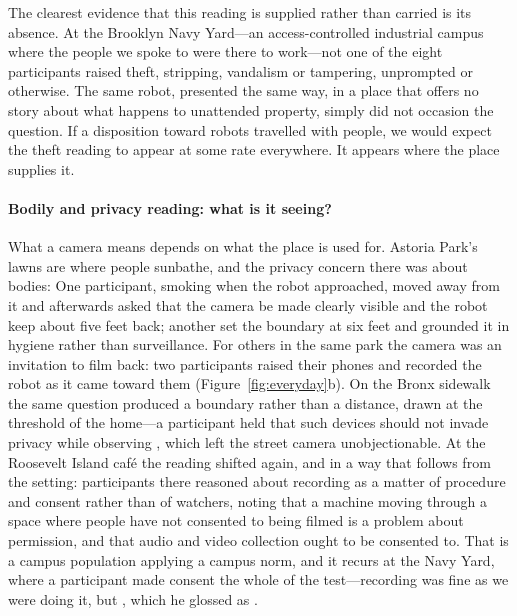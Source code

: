 The clearest evidence that this reading is supplied rather than carried is its
absence. At the Brooklyn Navy Yard---an access-controlled industrial campus where
the people we spoke to were there to work---not one of the eight participants
raised theft, stripping, vandalism or tampering, unprompted or otherwise. The
same robot, presented the same way, in a place that offers no story about what
happens to unattended property, simply did not occasion the question. If a
disposition toward robots travelled with people, we would expect the theft
reading to appear at some rate everywhere. It appears where the place supplies
it.

\paragraph{Bodily and privacy reading: what is it seeing?}
What a camera means depends on what the place is used for. Astoria Park's lawns
are where people sunbathe, and the privacy concern there was about bodies:
 One
participant, smoking when the robot approached, moved away from it and afterwards
asked that the camera be made clearly visible and the robot keep about five feet
back; another set the boundary at six feet and grounded it in hygiene rather than
surveillance. For others in the same park the camera was an invitation to film
back: two participants raised their phones and recorded the robot as it came
toward them (Figure~\ref{fig:everyday}b). On the Bronx sidewalk the same
question produced a boundary rather
than a distance, drawn at the threshold of the home---a participant held that
such devices should not invade privacy while observing , which left the street camera unobjectionable.
At the Roosevelt Island café the reading shifted again, and in a way that follows
from the setting: participants there reasoned about recording as a matter of
procedure and consent rather than of watchers, noting that a machine moving
through a space where people have not consented to being filmed is a problem
about permission, and that audio and video collection ought to be consented to.
That is a campus population applying a campus norm, and it recurs at the Navy
Yard, where a participant made consent the whole of the test---recording was
fine as we were doing it, but , which he glossed as .

